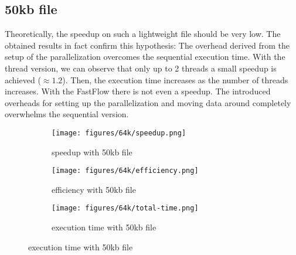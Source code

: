 \documentclass{article}
\begin{document}
\subsection{50kb file}
Theoretically, the speedup on such a lightweight file should be very low.
The obtained results in fact confirm this hypothesis: The overhead derived
from the setup of the parallelization overcomes the sequential execution time.
With the thread version, we can observe that only up to 2 threads a small speedup is achieved ($\approx 1.2$).
Then, the execution time increases as the number of threads increases.
With the FastFlow there is not even a speedup. The introduced overheads
for setting up the parallelization and moving data around completely overwhelms the sequential version.
\begin{figure}[H]
    \begin{subfigure}{0.5\textwidth}
        \centering
        \texttt{[image: figures/64k/speedup.png]}
        \caption{speedup with 50kb file}
    \end{subfigure}
    \begin{subfigure}{0.5\textwidth}
        \centering
        \texttt{[image: figures/64k/efficiency.png]}
        \caption{efficiency with 50kb file}
    \end{subfigure}
    \begin{subfigure}{0.5\textwidth}
        \centering
        \texttt{[image: figures/64k/total-time.png]}
        \caption{execution time with 50kb file}
    \end{subfigure}
\end{figure}
\end{document}
